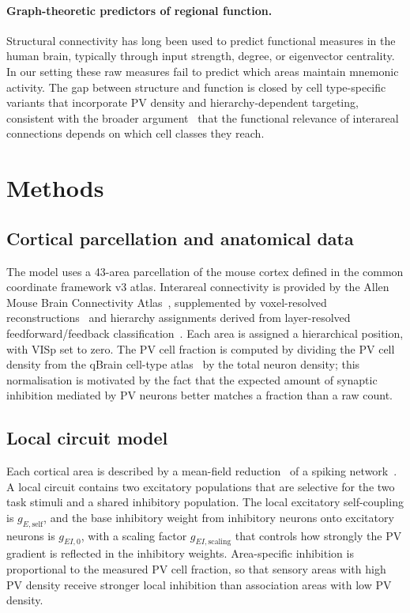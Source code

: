 \documentclass[11pt]{article}
\begin{document}
\paragraph{Graph-theoretic predictors of regional function.}
Structural connectivity has long been used to predict functional measures in the human brain, typically through input strength, degree, or eigenvector centrality. In our setting these raw measures fail to predict which areas maintain mnemonic activity. The gap between structure and function is closed by cell type-specific variants that incorporate PV density and hierarchy-dependent targeting, consistent with the broader argument~\cite{wang2020macroscopic,fulcher2019overlapping} that the functional relevance of interareal connections depends on which cell classes they reach.

\section{Methods}\label{sec:methods}

\subsection{Cortical parcellation and anatomical data}
The model uses a 43-area parcellation of the mouse cortex defined in the common coordinate framework v3 atlas. Interareal connectivity is provided by the Allen Mouse Brain Connectivity Atlas~\cite{oh2014mesoscale}, supplemented by voxel-resolved reconstructions~\cite{knox2018highresolution} and hierarchy assignments derived from layer-resolved feedforward/feedback classification~\cite{harris2019hierarchical}. Each area is assigned a hierarchical position, with VISp set to zero. The PV cell fraction is computed by dividing the PV cell density from the qBrain cell-type atlas~\cite{kim2017braintype} by the total neuron density; this normalisation is motivated by the fact that the expected amount of synaptic inhibition mediated by PV neurons better matches a fraction than a raw count.

\subsection{Local circuit model}
Each cortical area is described by a mean-field reduction~\cite{wongwang2006recurrent} of a spiking network~\cite{wang2002probabilistic}. A local circuit contains two excitatory populations that are selective for the two task stimuli and a shared inhibitory population. The local excitatory self-coupling is $g_{E,\text{self}}$, and the base inhibitory weight from inhibitory neurons onto excitatory neurons is $g_{EI,0}$, with a scaling factor $g_{EI,\text{scaling}}$ that controls how strongly the PV gradient is reflected in the inhibitory weights. Area-specific inhibition is proportional to the measured PV cell fraction, so that sensory areas with high PV density receive stronger local inhibition than association areas with low PV density.
\end{document}
